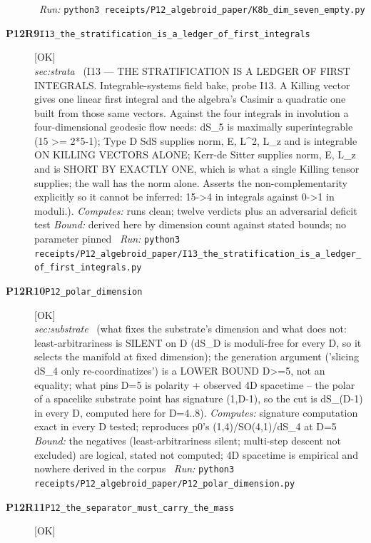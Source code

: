 \begin{description}
\ \emph{Run:} \texttt{python3 receipts/P12\_algebroid\_paper/K8b\_dim\_seven\_empty.py}
\item[\rcptlabel{I13_the_stratification_is_a_ledger_of_first_integrals}{P12R9}\textbf{P12R9}\quad\texttt{I13\_the\_stratification\_is\_a\_ledger\_of\_first\_integrals}]\hfill\textsf{[OK]}\\
\textit{sec:strata} \ (I13 --- THE STRATIFICATION IS A LEDGER OF FIRST INTEGRALS. Integrable-systems field bake, probe I13. A Killing vector gives one linear first integral and the algebra's Casimir a quadratic one built from those same vectors. Against the four integrals in involution a four-dimensional geodesic flow needs: dS\_5 is maximally superintegrable (15 >= 2*5-1); Type D SdS supplies norm, E, L\textasciicircum{}2, L\_z and is integrable ON KILLING VECTORS ALONE; Kerr-de Sitter supplies norm, E, L\_z and is SHORT BY EXACTLY ONE, which is what a single Killing tensor supplies; the wall has the norm alone. Asserts the non-complementarity explicitly so it cannot be inferred: 15->4 in integrals against 0->1 in moduli.). 
\emph{Computes:} runs clean; twelve verdicts plus an adversarial deficit test
 \emph{Bound:} derived here by dimension count against stated bounds; no parameter pinned
\ \emph{Run:} \texttt{python3 receipts/P12\_algebroid\_paper/I13\_the\_stratification\_is\_a\_ledger\_of\_first\_integrals.py}
\item[\rcptlabel{P12_polar_dimension}{P12R10}\textbf{P12R10}\quad\texttt{P12\_polar\_dimension}]\hfill\textsf{[OK]}\\
\textit{sec:substrate} \ (what fixes the substrate's dimension and what does not: least-arbitrariness is SILENT on D (dS\_D is moduli-free for every D, so it selects the manifold at fixed dimension); the generation argument ('slicing dS\_4 only re-coordinatizes') is a LOWER BOUND D>=5, not an equality; what pins D=5 is polarity + observed 4D spacetime -- the polar of a spacelike substrate point has signature (1,D-1), so the cut is dS\_(D-1) in every D, computed here for D=4..8). 
\emph{Computes:} signature computation exact in every D tested; reproduces p0's (1,4)/SO(4,1)/dS\_4 at D=5
 \emph{Bound:} the negatives (least-arbitrariness silent; multi-step descent not excluded) are logical, stated not computed; 4D spacetime is empirical and nowhere derived in the corpus
\ \emph{Run:} \texttt{python3 receipts/P12\_algebroid\_paper/P12\_polar\_dimension.py}
\item[\rcptlabel{P12_the_separator_must_carry_the_mass}{P12R11}\textbf{P12R11}\quad\texttt{P12\_the\_separator\_must\_carry\_the\_mass}]\hfill\textsf{[OK]}\\

\end{description}
